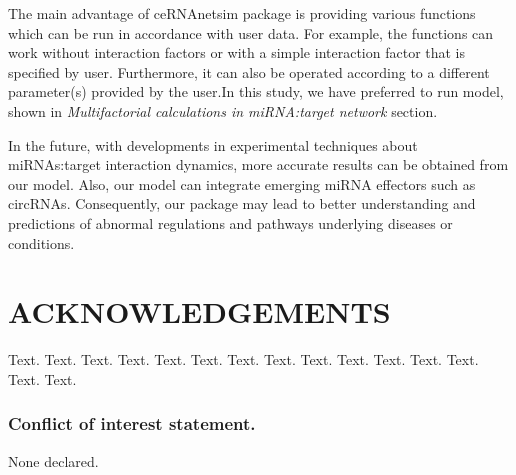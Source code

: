 \documentclass[a4,center,fleqn]{NAR}
\begin{document}
The main advantage of ceRNAnetsim package is providing various functions
which can be run in accordance with user data. For example, the
functions can work without interaction factors or with a simple
interaction factor that is specified by user. Furthermore, it can also
be operated according to a different parameter(s) provided by the
user.In this study, we have preferred to run model, shown in
\emph{Multifactorial calculations in miRNA:target network} section.

In the future, with developments in experimental techniques about
miRNAs:target interaction dynamics, more accurate results can be
obtained from our model. Also, our model can integrate emerging miRNA
effectors such as circRNAs. Consequently, our package may lead to better
understanding and predictions of abnormal regulations and pathways
underlying diseases or conditions.

\section{ACKNOWLEDGEMENTS}

Text. Text. Text. Text. Text. Text. Text. Text. Text. Text. Text. Text.
Text. Text. Text.

\subsubsection{Conflict of interest statement.}

None declared.

\newpage



\end{document}
